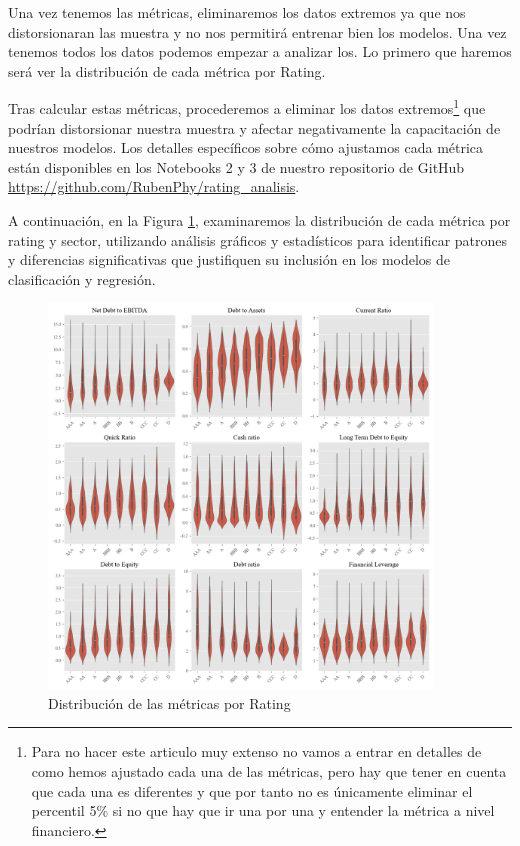 \documentclass{article}
\begin{document}
Una vez tenemos las métricas, eliminaremos los datos extremos  ya que nos distorsionaran las muestra y no nos permitirá entrenar bien los modelos. Una vez tenemos todos los datos podemos empezar a analizar los. Lo primero que haremos será ver la distribución de cada métrica por Rating. 

Tras calcular estas métricas, procederemos a eliminar los datos extremos\footnote{Para no hacer este articulo muy extenso no vamos a entrar en detalles de como hemos ajustado cada una de las métricas, pero hay que tener en cuenta que cada una es diferentes y que por tanto no es únicamente eliminar el percentil 5\% si no que hay que ir una por una y entender la métrica a nivel financiero.} que podrían distorsionar nuestra muestra y afectar negativamente la capacitación de nuestros modelos. Los detalles específicos sobre cómo ajustamos cada métrica están disponibles en los Notebooks 2 y 3 de nuestro repositorio de GitHub \url{https://github.com/RubenPhy/rating_analisis}.

A continuación, en la Figura \ref{fig:dist_met_rat}, examinaremos la distribución de cada métrica por rating y sector, utilizando análisis gráficos y estadísticos para identificar patrones y diferencias significativas que justifiquen su inclusión en los modelos de clasificación y regresión.

\begin{figure}
\centering
\includegraphics[width=0.91\textwidth]{distribution_metricas_por_rating.png}
\caption{Distribución de las métricas por Rating}
\label{fig:dist_met_rat}
\end{figure}
\end{document}
